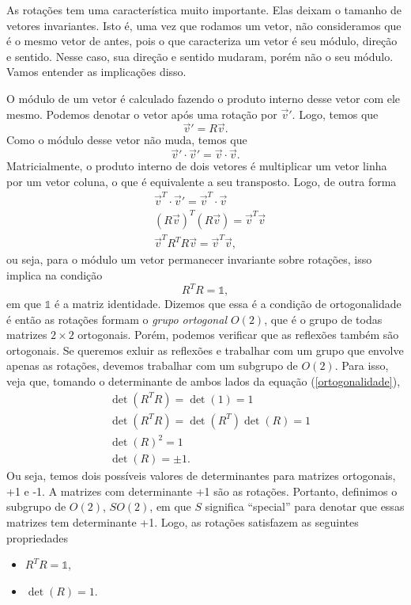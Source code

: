 \documentclass{article}
\numberwithin{equation}{section}
\numberwithin{figure}{section}
\begin{document}
As rotações tem uma característica muito importante. Elas deixam o tamanho de vetores invariantes. Isto é, uma vez que rodamos um vetor, não consideramos que é o mesmo vetor de antes, pois o que caracteriza um vetor é seu módulo, direção e sentido. Nesse caso, sua direção e sentido mudaram, porém não o seu módulo. Vamos entender as implicações disso. 

O módulo de um vetor é calculado fazendo o produto interno desse vetor com ele mesmo. Podemos denotar o vetor após uma rotação por $\vec{v}'$. Logo, temos que 
\begin{equation}
	\vec{v}'=R\vec{v}.
\end{equation} 
Como o módulo desse vetor não muda, temos que 
\begin{equation}
	\vec{v}'\cdot \vec{v}'=\vec{v}\cdot \vec{v}.
\end{equation}
Matricialmente, o produto interno de dois vetores é multiplicar um vetor linha por um vetor coluna, o que é equivalente a seu transposto. Logo, de outra forma 
\begin{equation*}
\begin{split}
		&\vec{v}^T\cdot \vec{v}'=\vec{v}^T\cdot\vec{v}\\
		&(R\vec{v})^T(R\vec{v})=\vec{v}^T\vec{v}\\
		&\vec{v}^TR^TR\vec{v}=\vec{v}^T\vec{v},
\end{split}
\end{equation*}
ou seja, para o módulo um vetor permanecer invariante sobre rotações, isso implica na condição 
\begin{equation}\label{ortogonalidade}
	R^TR=\mathds{1},
\end{equation}
em que $\mathds{1}$ é a matriz identidade. Dizemos que essa é a condição de ortogonalidade é então as rotações formam o \textit{grupo ortogonal $O(2)$}, que é o grupo de todas matrizes $2\times2$ ortogonais. Porém, podemos verificar que as reflexões também são ortogonais. Se queremos exluir as reflexões e trabalhar com um grupo que envolve apenas as rotações, devemos trabalhar com um subgrupo de $O(2)$. Para isso, veja que, tomando o determinante de ambos lados da equação (\ref{ortogonalidade}), 
\begin{equation*}
	\begin{split}
		&\det(R^TR)=\det(1)=1\\
		&\det(R^TR)=\det (R^T)\det (R)=1\\
		&\det(R)^2=1\\
		&\det(R)=\pm 1.
	\end{split}
\end{equation*}
Ou seja, temos dois possíveis valores de determinantes para matrizes ortogonais, +1 e -1. A matrizes com determinante +1 são as rotações. Portanto, definimos o subgrupo de $O(2)$, $SO(2)$, em que $S$ significa ``special'' para denotar que essas matrizes tem determinante +1. Logo, as rotações satisfazem as seguintes propriedades
\begin{itemize}
	\item $R^TR=\mathds{1}$,
	\item $\det(R)=1$.
\end{itemize}
\end{document}

